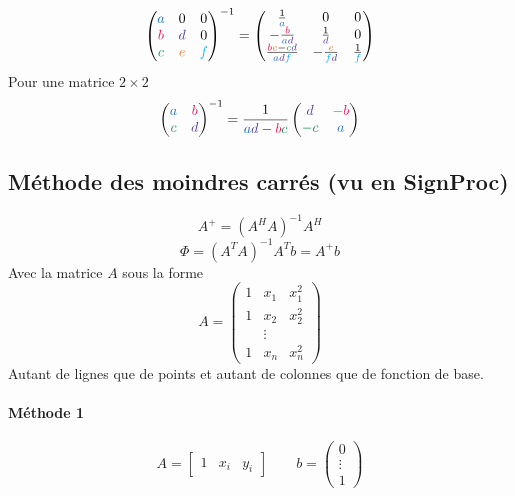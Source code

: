 \documentclass[resume]{subfiles}
\begin{document}
$$\begin{pmatrix}
\textcolor{RoyalBlue}{a} & 0 & 0\\
\textcolor{OrangeRed}{b} & \textcolor{Violet}{d} & 0\\
\textcolor{ForestGreen}{c} & \textcolor{Orange}{e} & \textcolor{ProcessBlue}{f}
\end{pmatrix}^{-1}=\begin{pmatrix}
\frac{1}{\textcolor{RoyalBlue}{a}} & 0 & 0\\
-\frac{\textcolor{OrangeRed}{b}}{\textcolor{RoyalBlue}{a}\textcolor{Violet}{d}} & \frac{1}{\textcolor{Violet}{d}} & 0\\
\frac{\textcolor{OrangeRed}{b}\textcolor{Orange}{e}-\textcolor{ForestGreen}{c}\textcolor{Violet}{d}}{\textcolor{RoyalBlue}{a}\textcolor{Violet}{d}\textcolor{ProcessBlue}{f}} & -\frac{\textcolor{Orange}{e}}{\textcolor{ProcessBlue}{f}\textcolor{Violet}{d}} &
\frac{1}{\textcolor{ProcessBlue}{f}}
\end{pmatrix}$$
Pour une matrice $2\times 2$
$$\begin{pmatrix}
\textcolor{RoyalBlue}{a} & \textcolor{OrangeRed}{b}\\
\textcolor{ForestGreen}{c} & \textcolor{Violet}{d}
\end{pmatrix}^{-1}=\frac{1}{\textcolor{RoyalBlue}{a}\textcolor{Violet}{d}-\textcolor{OrangeRed}{b}\textcolor{ForestGreen}{c}}\begin{pmatrix}
\textcolor{Violet}{d} & \textcolor{OrangeRed}{-b}\\
\textcolor{ForestGreen}{-c} & \textcolor{RoyalBlue}{a}
\end{pmatrix}$$
\subsection{Méthode des moindres carrés (vu en SignProc)}
$$A^{+}=\left(A^HA\right)^{-1}A^H$$
$$\Phi=(A^TA)^{-1}A^Tb=A^{+}b$$
Avec la matrice $A$ sous la forme
$$A=\begin{pmatrix}
1 & x_1 & x_1^2\\
1 & x_2 & x_2^2\\
 & \vdots \\
1 & x_{n} & x_{n}^2
\end{pmatrix}$$
Autant de lignes que de points et autant de colonnes que de fonction de base.
\paragraph{Méthode 1}
$$A=\begin{bmatrix}
1 & x_i & y_i
\end{bmatrix}\qquad b=\begin{pmatrix}
0\\
\vdots\\
1
\end{pmatrix}$$
\end{document}
